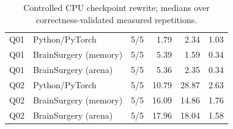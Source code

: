 \begin{table}[t]
\begin{tabular}{lllrrr}
Q01 & Python/PyTorch & 5/5 & 1.79 & 2.34 & 1.03 \\
Q01 & BrainSurgery (memory) & 5/5 & 5.39 & 1.59 & 0.34 \\
Q01 & BrainSurgery (arena) & 5/5 & 5.36 & 2.35 & 0.34 \\
Q02 & Python/PyTorch & 5/5 & 10.79 & 28.87 & 2.63 \\
Q02 & BrainSurgery (memory) & 5/5 & 16.09 & 14.86 & 1.76 \\
Q02 & BrainSurgery (arena) & 5/5 & 17.96 & 18.04 & 1.58 \\
\bottomrule
\end{tabular}
\caption{Controlled CPU checkpoint rewrite; medians over correctness-validated measured repetitions.}
\label{tab:checkpoint-scaling}
\end{table}
